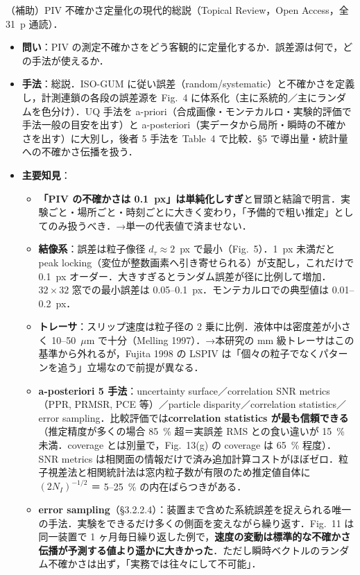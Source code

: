 \documentclass[11pt]{jsarticle}
\newcommand{\litref}[1]{{\large\bfseries\color{citecolor}#1}}
\begin{document}
\noindent\litref{Sciacchitano (2019)}\quad（補助）PIV 不確かさ定量化の現代的総説（Topical Review，Open Access，全 31~p 通読）．
\begin{itemize}
  \item \textbf{問い}：PIV の測定不確かさをどう客観的に定量化するか．誤差源は何で，どの手法が使えるか．
  \item \textbf{手法}：総説．ISO-GUM に従い誤差（random/systematic）と不確かさを定義し，計測連鎖の各段の誤差源を Fig.~4 に体系化（主に系統的／主にランダムを色分け）．UQ 手法を a-priori（合成画像・モンテカルロ・実験的評価で手法一般の目安を出す）と a-posteriori（実データから局所・瞬時の不確かさを出す）に大別し，後者 5 手法を Table~4 で比較．§5 で導出量・統計量への不確かさ伝播を扱う．
  \item \textbf{主要知見}：
  \begin{itemize}
    \item \textbf{「PIV の不確かさは 0.1~px」は単純化しすぎ}と冒頭と結論で明言．実験ごと・場所ごと・時刻ごとに大きく変わり，「予備的で粗い推定」としてのみ扱うべき．→単一の代表値で済ませない．
    \item \textbf{結像系}：誤差は粒子像径 $d_\tau \approx 2$~px で最小（Fig.~5）．1~px 未満だと peak locking（変位が整数画素へ引き寄せられる）が支配し，これだけで 0.1~px オーダー．大きすぎるとランダム誤差が径に比例して増加．$32 \times 32$ 窓での最小誤差は 0.05--0.1~px．モンテカルロでの典型値は 0.01--0.2~px．
    \item \textbf{トレーサ}：スリップ速度は粒子径の 2 乗に比例．液体中は密度差が小さく 10--50~$\mu$m で十分（Melling 1997）．→本研究の mm 級トレーサはこの基準から外れるが，Fujita 1998 の LSPIV は「個々の粒子でなくパターンを追う」立場なので前提が異なる．
    \item \textbf{a-posteriori 5 手法}：uncertainty surface／correlation SNR metrics（PPR, PRMSR, PCE 等）／particle disparity／correlation statistics／error sampling．比較評価では\textbf{correlation statistics が最も信頼できる}（推定精度が多くの場合 85~\% 超＝実誤差 RMS との食い違いが 15~\% 未満．coverage とは別量で，Fig.~13(g) の coverage は 65~\% 程度）．SNR metrics は相関面の情報だけで済み追加計算コストがほぼゼロ．粒子視差法と相関統計法は窓内粒子数が有限のため推定値自体に $(2N_I)^{-1/2}$ ＝ 5--25~\% の内在ばらつきがある．
    \item \textbf{error sampling}（§3.2.2.4）：装置まで含めた系統誤差を捉えられる唯一の手法．実験をできるだけ多くの側面を変えながら繰り返す．Fig.~11 は同一装置で 1 ヶ月毎日繰り返した例で，\textbf{速度の変動は標準的な不確かさ伝播が予測する値より遥かに大きかった}．ただし瞬時ベクトルのランダム不確かさは出ず，「実務では往々にして不可能」．

\end{itemize}
\end{itemize}
\end{document}
